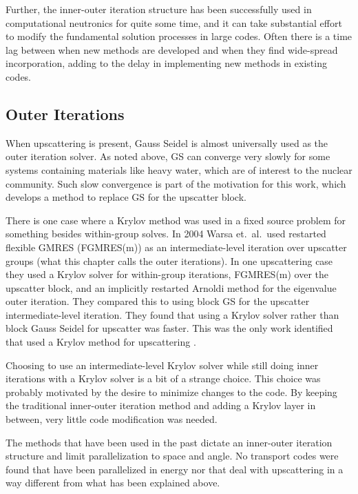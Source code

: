 Further, the inner-outer iteration structure has been successfully used in computational neutronics for quite some time, and it can take substantial effort to modify the fundamental solution processes in large codes. Often there is a time lag between when new methods are developed and when they find wide-spread incorporation, adding to the delay in implementing new methods in existing codes.

\subsection{Outer Iterations}
When upscattering is present, Gauss Seidel is almost universally used as the outer iteration solver. As noted above, GS can converge very slowly for some systems containing materials like heavy water, which are of interest to the nuclear community. Such slow convergence is part of the motivation for this work, which develops a method to replace GS for the upscatter block. 

There is one case where a Krylov method was used in a fixed source problem for something besides within-group solves. In 2004 Warsa et.\ al.\ used restarted flexible GMRES (FGMRES(m)) as an intermediate-level iteration over upscatter groups (what this chapter calls the outer iterations). In one upscattering case they used a Krylov solver for within-group iterations, FGMRES(m) over the upscatter block, and an implicitly restarted Arnoldi method for the eigenvalue outer iteration. They compared this to using block GS for the upscatter intermediate-level iteration. They found that using a Krylov solver rather than block Gauss Seidel for upscatter was faster. This was the only work identified that used a Krylov method for upscattering \cite{Warsa2004a}. 

Choosing to use an intermediate-level Krylov solver while still doing inner iterations with a Krylov solver is a bit of a strange choice. This choice was probably motivated by the desire to minimize changes to the code. By keeping the traditional inner-outer iteration method and adding a Krylov layer in between, very little code modification was needed. 

The methods that have been used in the past dictate an inner-outer iteration structure and limit parallelization to space and angle. No transport codes were found that have been parallelized in energy nor that deal with upscattering in a way different from what has been explained above. 

